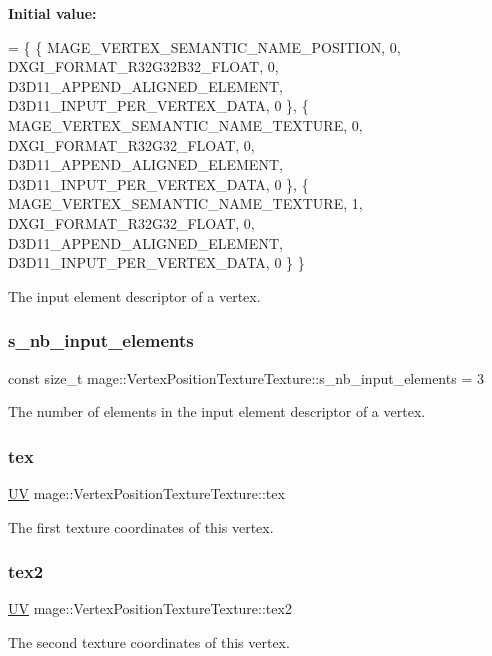 {\bfseries Initial value\+:}
\begin{DoxyCode}
= \{
        \{ MAGE\_VERTEX\_SEMANTIC\_NAME\_POSITION, 0, DXGI\_FORMAT\_R32G32B32\_FLOAT,    0, 
      D3D11\_APPEND\_ALIGNED\_ELEMENT, D3D11\_INPUT\_PER\_VERTEX\_DATA, 0 \},
        \{ MAGE\_VERTEX\_SEMANTIC\_NAME\_TEXTURE,  0, DXGI\_FORMAT\_R32G32\_FLOAT,       0, 
      D3D11\_APPEND\_ALIGNED\_ELEMENT, D3D11\_INPUT\_PER\_VERTEX\_DATA, 0 \},
        \{ MAGE\_VERTEX\_SEMANTIC\_NAME\_TEXTURE,  1, DXGI\_FORMAT\_R32G32\_FLOAT,       0, 
      D3D11\_APPEND\_ALIGNED\_ELEMENT, D3D11\_INPUT\_PER\_VERTEX\_DATA, 0 \}
    \}
\end{DoxyCode}
The input element descriptor of a vertex. \hypertarget{structmage_1_1_vertex_position_texture_texture_ab045a99425860b68ac9fc27e44edf4cf}{}\label{structmage_1_1_vertex_position_texture_texture_ab045a99425860b68ac9fc27e44edf4cf} 
\subsubsection{\texorpdfstring{s\+\_\+nb\+\_\+input\+\_\+elements}{s\_nb\_input\_elements}}
{\footnotesize\ttfamily const size\+\_\+t mage\+::\+Vertex\+Position\+Texture\+Texture\+::s\+\_\+nb\+\_\+input\+\_\+elements = 3\hspace{0.3cm}{\ttfamily [static]}}

The number of elements in the input element descriptor of a vertex. \hypertarget{structmage_1_1_vertex_position_texture_texture_ae47656414d503a2c96c88fa6d485cccf}{}\label{structmage_1_1_vertex_position_texture_texture_ae47656414d503a2c96c88fa6d485cccf} 
\subsubsection{\texorpdfstring{tex}{tex}}
{\footnotesize\ttfamily \hyperlink{structmage_1_1_u_v}{UV} mage\+::\+Vertex\+Position\+Texture\+Texture\+::tex}

The first texture coordinates of this vertex. \hypertarget{structmage_1_1_vertex_position_texture_texture_a5a41669f18385d932c1490ff20c80bed}{}\label{structmage_1_1_vertex_position_texture_texture_a5a41669f18385d932c1490ff20c80bed} 
\subsubsection{\texorpdfstring{tex2}{tex2}}
{\footnotesize\ttfamily \hyperlink{structmage_1_1_u_v}{UV} mage\+::\+Vertex\+Position\+Texture\+Texture\+::tex2}

The second texture coordinates of this vertex. 